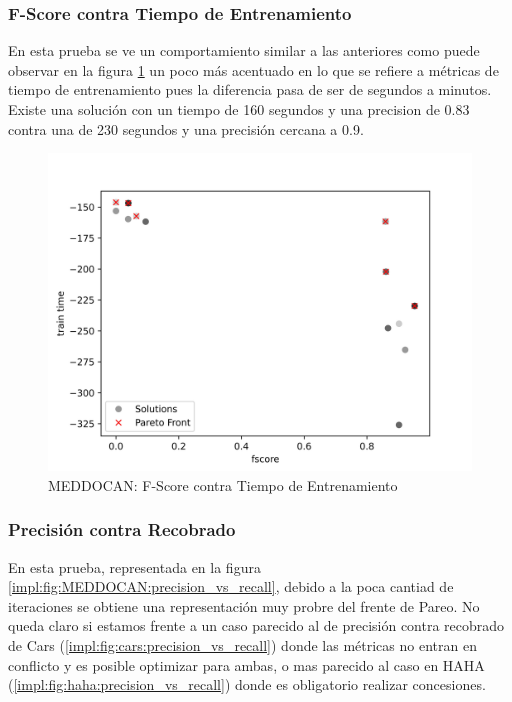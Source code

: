 \subsubsection{F-Score contra Tiempo de Entrenamiento}
En esta prueba se ve un comportamiento similar a las anteriores como puede observar en la figura  \ref{impl:fig:MEDDOCAN:fscore_vs_train_time} un poco m\'as acentuado en lo que se refiere a m\'etricas de tiempo de entrenamiento pues la diferencia pasa de ser de segundos a minutos. Existe una soluci\'on con un tiempo de 160 segundos y una precision de 0.83 contra una de 230 segundos y una precisi\'on cercana a 0.9.  

\begin{figure}[ht]
    \centering
    \includegraphics[scale=0.65]{Pictures/meddocan_fscore_vs_train.jpg}
    \caption{MEDDOCAN: F-Score contra Tiempo de Entrenamiento}
    \label{impl:fig:MEDDOCAN:fscore_vs_train_time}
\end{figure}


\subsubsection{Precisi\'on contra Recobrado}

En esta prueba, representada en la figura \ref{impl:fig:MEDDOCAN:precision_vs_recall}, debido a la poca cantiad de iteraciones se obtiene una representaci\'on muy probre del frente de Pareo. No queda claro si estamos frente a un caso parecido al de precisi\'on contra recobrado de Cars (\ref{impl:fig:cars:precision_vs_recall}) donde las m\'etricas no entran en conflicto y es posible optimizar para ambas, o mas parecido al caso en HAHA (\ref{impl:fig:haha:precision_vs_recall}) donde es obligatorio realizar concesiones.

